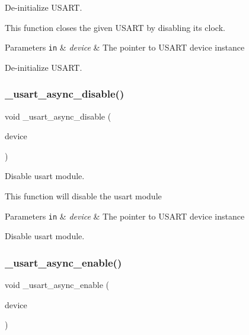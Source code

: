 De-\/initialize U\+S\+A\+RT. 

This function closes the given U\+S\+A\+RT by disabling its clock.


\begin{DoxyParams}[1]{Parameters}
\mbox{\tt in}  & {\em device} & The pointer to U\+S\+A\+RT device instance\\
\hline
\end{DoxyParams}
De-\/initialize U\+S\+A\+RT. \mbox{\label{group___h_p_l_gadb6751e5c270eb88eb754f45e7b8a91f}} 
\subsubsection{\texorpdfstring{\+\_\+usart\+\_\+async\+\_\+disable()}{\_usart\_async\_disable()}}
{\footnotesize\ttfamily void \+\_\+usart\+\_\+async\+\_\+disable (\begin{DoxyParamCaption}\item[{struct \hyperlink{struct__usart__async__device}{\+\_\+usart\+\_\+async\+\_\+device} $\ast$const}]{device }\end{DoxyParamCaption})}



Disable usart module. 

This function will disable the usart module


\begin{DoxyParams}[1]{Parameters}
\mbox{\tt in}  & {\em device} & The pointer to U\+S\+A\+RT device instance\\
\hline
\end{DoxyParams}
Disable usart module. \mbox{\label{group___h_p_l_ga86c4101798d9dbc584f1e56615140d6f}} 
\subsubsection{\texorpdfstring{\+\_\+usart\+\_\+async\+\_\+enable()}{\_usart\_async\_enable()}}
{\footnotesize\ttfamily void \+\_\+usart\+\_\+async\+\_\+enable (\begin{DoxyParamCaption}\item[{struct \hyperlink{struct__usart__async__device}{\+\_\+usart\+\_\+async\+\_\+device} $\ast$const}]{device }\end{DoxyParamCaption})}



